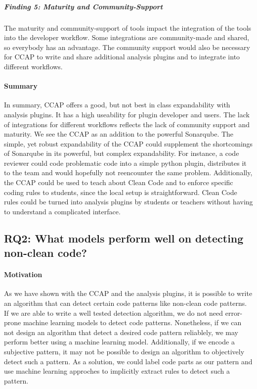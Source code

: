 \subparagraph{Finding 5: Maturity and Community-Support}
The maturity and community-support of tools impact the integration of the tools into the developer workflow. Some integrations are community-made and shared, so everybody has an advantage. The community support would also be necessary for CCAP to write and share additional analysis plugins and to integrate into different workflows.

\paragraph{Summary}
In summary, CCAP offers a good, but not best in class expandability with analysis plugins. It has a high useability for plugin developer and users. The lack of integrations for different workflows reflects the lack of community support and maturity. 
We see the CCAP as an addition to the powerful Sonarqube. The simple, yet robust expandability of the CCAP could supplement the shortcomings of Sonarqube in its powerful, but complex expandability. For instance, a code reviewer could code problematic code into a simple python plugin, distributes it to the team and would hopefully not reencounter the same problem.
Additionally, the CCAP could be used to teach about Clean Code and to enforce specific coding rules to students, since the local setup is straightforward. Clean Code rules could be turned into analysis plugins by students or teachers without having to understand a complicated interface.

\subsection{RQ2: What models perform well on detecting non-clean code?}
\paragraph{Motivation}
As we have shown with the CCAP and the analysis plugins, it is possible to write an algorithm that can detect certain code patterns like non-clean code patterns. If we are able to write a well tested detection algorithm, we do not need error-prone machine learning models to detect code patterns. Nonetheless, if we can not design an algorithm that detect a desired code pattern reliablely, we may perform better using a machine learning model. Additionally, if we encode a subjective pattern, it may not be possible to design an algorithm to objectively detect such a pattern. As a solution, we could label code parts as our pattern and use machine learning approches to implicitly extract rules to detect such a pattern.

